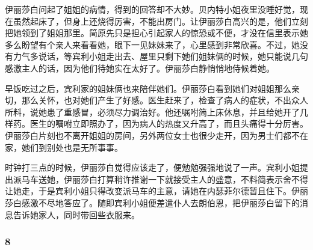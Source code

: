 \par 伊丽莎白问起了姐姐的病情，得到的回答却不大妙。贝内特小姐夜里没睡好觉，现在虽然起床了，但身上还烧得厉害，不能出房门。让伊丽莎白高兴的是，他们立刻把她领到了姐姐那里。简原先只是担心引起家人的惊恐或不便，才没在信里表示她多么盼望有个亲人来看看她，眼下一见妹妹来了，心里感到非常欣喜。不过，她没有力气多说话，等宾利小姐走出去、屋里只剩下她们姐妹俩的时候，她只能说几句感激主人的话，因为他们待她实在太好了。伊丽莎白静悄悄地侍候着她。
\par 早饭吃过之后，宾利家的姐妹俩也来陪伴她们。伊丽莎白看到她们对姐姐那么亲切，那么关怀，也对她们产生了好感。医生赶来了，检查了病人的症状，不出众人所料，说她患了重感冒，必须尽力调治好。他还嘱咐简上床休息，并且给她开了几样药。医生的嘱咐立即照办了，因为病人的热度又升高了，而且头痛得十分厉害。伊丽莎白片刻也不离开姐姐的房间，另外两位女士也很少走开，因为男士们都不在家，她们到别处也是无所事事。
\par 时钟打三点的时候，伊丽莎白觉得应该走了，便勉勉强强地说了一声。宾利小姐提出派马车送她，伊丽莎白打算稍许推谢一下就接受主人的盛意，不料简表示舍不得让她走，于是宾利小姐只得改变派马车的主意，请她在内瑟菲尔德暂且住下。伊丽莎白感激不尽地答应了。随即宾利小姐便差遣仆人去朗伯恩，把伊丽莎白留下的消息告诉她家人，同时带回些衣服来。



\subsubsection*{8}

